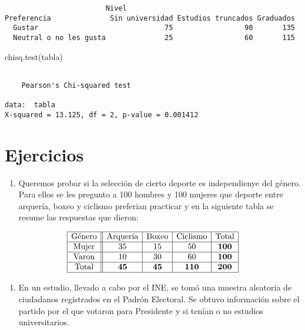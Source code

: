 \documentclass[
  a4paper,
  oneside,
  openany]{book}
\newenvironment{Shaded}{\begin{snugshade}}{\end{snugshade}}
\newcommand{\FunctionTok}[1]{\textcolor[rgb]{0.00,0.00,0.00}{#1}}
\newcommand{\NormalTok}[1]{#1}
\providecommand{\tightlist}{%
  \setlength{\itemsep}{0pt}\setlength{\parskip}{0pt}}
\begin{document}
\begin{verbatim}
                        Nivel
Preferencia              Sin universidad Estudios truncados Graduados
  Gustar                              75                 90       135
  Neutral o no les gusta              25                 60       115
\end{verbatim}

\begin{Shaded}
\begin{Highlighting}[]
\FunctionTok{chisq.test}\NormalTok{(tabla)}
\end{Highlighting}
\end{Shaded}

\begin{verbatim}

    Pearson's Chi-squared test

data:  tabla
X-squared = 13.125, df = 2, p-value = 0.001412
\end{verbatim}

\hypertarget{ejercicios-7}{%
\section{Ejercicios}\label{ejercicios-7}}

\begin{enumerate}
\def\labelenumi{\arabic{enumi}.}
\tightlist
\item
  Queremos probar si la selección de cierto deporte es independienye del género. Para ellos se les pregunto a 100 hombres y 100 mujeres que deporte entre arquería, boxeo y ciclismo preferian practicar y en la siguiente tabla se resume las respuestas que dieron:
\end{enumerate}

\[
\begin{array}{|c ||c |c |c|c|}
\hline 
\mbox{Género} & \mbox{Arquería}&\mbox{Boxeo} &\mbox{Ciclismo}& \mbox{Total} \\
\hline 
\mbox{Mujer} & 35 &  15 & 50&\textbf{100}\\
 \hline 
\mbox{Varon}& 10 & 30 &60&\textbf{100}\\ 
\hline 
\mbox{Total}&\textbf{45}&\textbf{45}&\textbf{110}&\textbf{200}\\
\hline 
\end{array}
\]

\begin{enumerate}
\def\labelenumi{\arabic{enumi}.}
\setcounter{enumi}{1}
\tightlist
\item
  En un estudio, llevado a cabo por el INE, se tomó una muestra aleatoria de ciudadanos registrados en el Padrón Electoral. Se obtuvo información sobre el partido por el que votaron para Presidente y si tenían o no estudios universitarios.
\end{enumerate}
\end{document}
